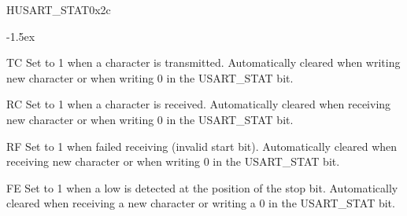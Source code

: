 \documentclass[12pt]{article}
\begin{document}
\begin{register}{H}{USART\_STAT}{0x2c}
\label{usartstat}
\regnewline%
\end{register}
\begin{regdesc}[0.8\textwidth]\begin{reglist}[0000]
\itemsep-1.5ex
\item[TC] Set to 1 when a character is transmitted. Automatically cleared when writing new character or when writing 0 in the USART\_STAT bit.
\item[RC] Set to 1 when a character is received. Automatically cleared when receiving new character or when writing 0 in the USART\_STAT bit.
\item[RF] Set to 1 when failed receiving (invalid start bit). Automatically cleared when receiving new character or when writing 0 in the USART\_STAT bit.
\item [FE] Set to 1 when a low is detected at the position of the stop bit. Automatically cleared when receiving a new character or writing a 0 in the USART\_STAT bit.
\end{reglist}\end{regdesc}
\end{document}
